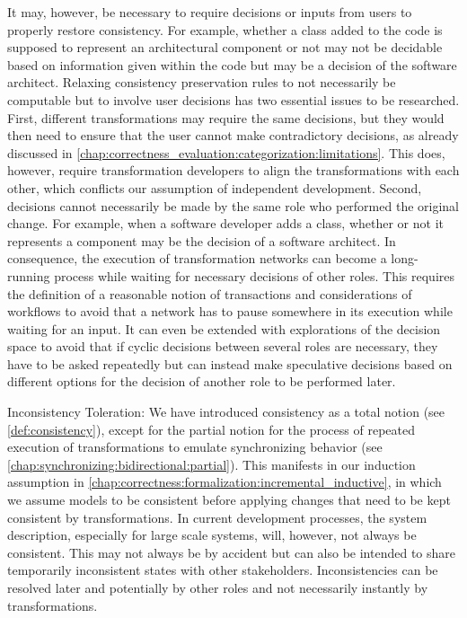 \begin{properdescription}
It may, however, be necessary to require decisions or inputs from users to properly restore consistency.
For example, whether a class added to the code is supposed to represent an architectural component or not may not be decidable based on information given within the code but may be a decision of the software architect.
Relaxing consistency preservation rules to not necessarily be computable but to involve user decisions has two essential issues to be researched.
First, different transformations may require the same decisions, but they would then need to ensure that the user cannot make contradictory decisions, as already discussed in \autoref{chap:correctness_evaluation:categorization:limitations}.
This does, however, require transformation developers to align the transformations with each other, which conflicts our assumption of independent development.
Second, decisions cannot necessarily be made by the same role who performed the original change.
For example, when a software developer adds a class, whether or not it represents a component may be the decision of a software architect.
In consequence, the execution of transformation networks can become a long-running process while waiting for necessary decisions of other roles.
This requires the definition of a reasonable notion of transactions and considerations of workflows to avoid that a network has to pause somewhere in its execution while waiting for an input.
It can even be extended with explorations of the decision space to avoid that if cyclic decisions between several roles are necessary, they have to be asked repeatedly but can instead make speculative decisions based on different options for the decision of another role to be performed later.
\item[Inconsistency Toleration:]
We have introduced consistency as a total notion (see \autoref{def:consistency}), except for the partial notion for the process of repeated execution of transformations to emulate synchronizing behavior (see \autoref{chap:synchronizing:bidirectional:partial}).
This manifests in our induction assumption in \autoref{chap:correctness:formalization:incremental_inductive}, in which we assume models to be consistent before applying changes that need to be kept consistent by transformations.
In current development processes, the system description, especially for large scale systems, will, however, not always be consistent.
This may not always be by accident but can also be intended to share temporarily inconsistent states with other stakeholders. 
Inconsistencies can be resolved later and potentially by other roles and not necessarily instantly by transformations.

\end{properdescription}
